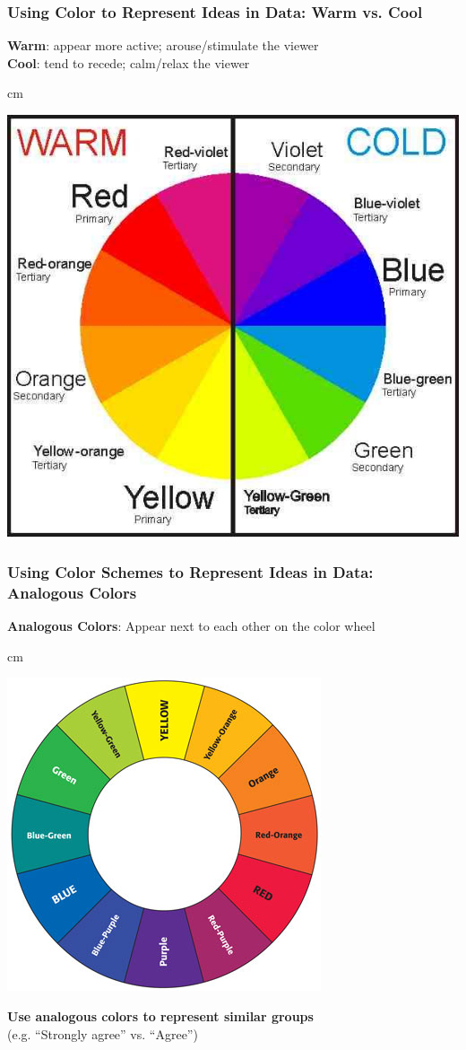 \documentclass{beamer} %
\begin{document}
\begin{frame}\frametitle{Using Color to Represent Ideas in Data:  Warm vs. Cool}
	\centering
	
	\textbf{Warm}:  appear more active; arouse/stimulate the viewer\\
	\textbf{Cool}:  tend to recede; calm/relax the viewer
	
	 cm
	
	\includegraphics[width=0.66\linewidth]{warmcold}
	
\end{frame}


\begin{frame}\frametitle{Using Color Schemes to Represent Ideas in Data: \\ Analogous Colors}
	\centering
	
	\textbf{Analogous Colors}:  Appear next to each other on the color wheel
	
	 cm
	
	\includegraphics[width=0.55\linewidth]{colorwheel2}
	
	\textbf{Use analogous colors to represent similar groups} \\(e.g. ``Strongly agree'' vs. ``Agree'')
	
\end{frame}
\end{document}
